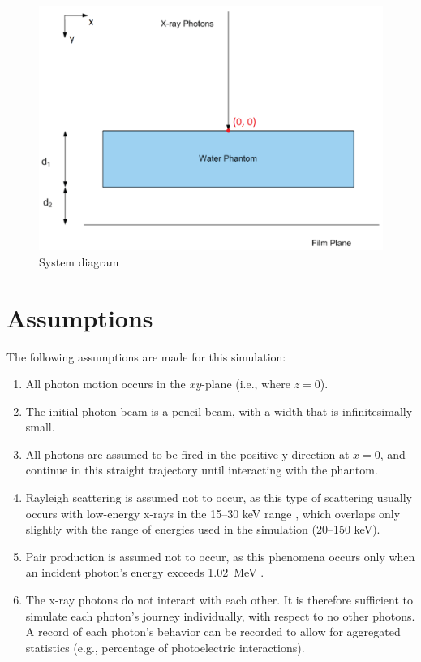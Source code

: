 \documentclass[12pt]{article} %
\begin{document}
\begin{figure}[h]
\centering
\includegraphics[scale=.5]{./images/system_diagram_2.png}
\caption{System diagram}
\label{system_diagram}
\end{figure}


\section*{Assumptions}
The following assumptions are made for this simulation:
\begin{enumerate}
\item All photon motion occurs in the $xy$\nobreakdash-plane (i.e., where $z = 0$).

\item The initial photon beam is a pencil beam, with a width that is infinitesimally small.

\item All photons are assumed to be fired in the positive y direction at $x = 0$, and continue in this straight trajectory until interacting with the phantom.


\item Rayleigh scattering is assumed not to occur, as this type of scattering usually occurs with low-energy x-rays in the 15--30 keV range \cite[p.~37]{bushberg2002}, which overlaps only slightly with the range of energies used in the simulation (20--150 keV).

\item Pair production is assumed not to occur, as this phenomena occurs only when an incident photon's energy exceeds 1.02~MeV \cite[p.~155]{johns1983}.

\item The x-ray photons do not interact with each other. It is therefore sufficient to simulate each photon's journey individually, with respect to no other photons. A record of each photon's behavior can be recorded to allow for aggregated statistics (e.g., percentage of photoelectric interactions).

\end{enumerate}
\end{document}
